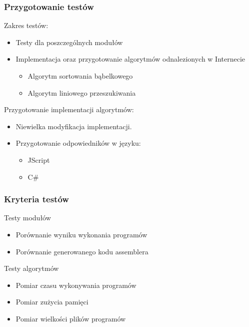 \begin{frame}
  \frametitle{Przygotowanie testów}
  \begin{block}{Zakres testów:}
  \begin{itemize}
    \item  Testy dla poszczególnych modułów
    \item  Implementacja oraz przygotowanie algorytmów odnalezionych w Internecie
    \begin{itemize}
      \item  Algorytm sortowania bąbelkowego
      \item  Algorytm liniowego przeszukiwania
    \end{itemize}
  \end{itemize}
  \end{block}
  \begin{block}{Przygotowanie implementacji algorytmów:}
    \begin{itemize}
      \item  Niewielka modyfikacja implementacji.
      \item  Przygotowanie odpowiedników w języku:
      \begin{itemize}
        \item JScript
        \item C\#
      \end{itemize}
    \end{itemize}
    \end{block}
\end{frame}

\begin{frame}
  \frametitle{Kryteria testów}
  \begin{block}{Testy modułów}
    \begin{itemize}
      \item  Porównanie wyniku wykonania programów
      \item  Porównanie generowanego kodu assemblera
    \end{itemize}
  \end{block}
  \begin{block}{Testy algorytmów}
    \begin{itemize}
      \item  Pomiar czasu wykonywania programów
      \item  Pomiar zużycia pamięci
      \item  Pomiar wielkości plików programów
    \end{itemize}
  \end{block}
\end{frame}


